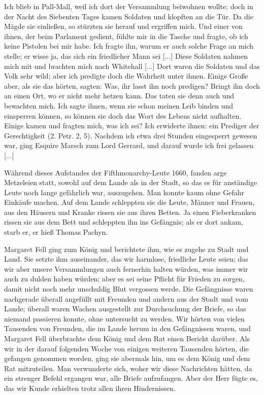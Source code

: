 Ich blieb in Pall-Mall, weil ich dort der Versammlung beiwohnen 
wollte; doch in der Nacht des Siebenten Tages kamen
Soldaten und klopften an die Tür. Da die Mägde sie einließen,
so stürzten sie herauf und ergriffen mich. Und einer von ihnen,
der beim Parlament gedient, fühlte mir in die Tasche und fragte,
ob ich keine Pistolen bei mir habe. Ich fragte ihn, warum er
auch solche Frage an mich stelle; er wisse ja, das sich ein 
friedlicher Mann sei [...] Diese Soldaten nahmen mich mit und
brachten mich nach Whitehall [...] Dort waren die Soldaten
und das Volk sehr wild; aber ich predigte doch die Wahrheit
unter ihnen. Einige Große aber, als sie das hörten, sagten:
\glqq Was, ihr lasst ihn noch predigen? Bringt ihn doch an einen
Ort, wo er nicht mehr hetzen kann.\grqq{} Das taten sie denn auch
und bewachten mich. Ich sagte ihnen, wenn sie schon meinen
Leib binden und einsperren können, so können sie doch das Wort
des Lebens nicht aufhalten. Einige kamen und fragten mich,
was ich sei? Ich erwiderte ihnen: \glqq ein Prediger der 
Gerechtigkeit\grqq{} (2. Petr. 2, 5). Nachdem ich etwa drei 
Stunden eingesperrt gewesen war, ging Esquire Marsch zum Lord 
Gerrard, und darauf wurde ich frei gelassen [...]

Während dieses Aufstandes der Fifthmonarchy-Leute 1660,
fanden arge Metzeleien statt, sowohl auf dem Lande als in der
Stadt, so das es für anständige Leute noch lange gefährlich war,
auszugehen. Man konnte kaum ohne Gefahr Einkäufe machen.
Auf dem Lande schleppten sie die Leute, Männer und Frauen,
aus den Häusern und Kranke rissen sie aus ihren Betten. Ja
einen Fieberkranken rissen sie aus dem Bett und schleppten ihn
ins Gefängnis; als er dort ankam, starb er, er hieß Thomas
Pachyn.

Margaret Fell ging zum König und berichtete ihm, wie es
zugehe zu Stadt und Land. Sie setzte ihm auseinander, das wir
harmlose, friedliche Leute seien; das wir aber unsere Versammlungen 
auch fernerhin halten würden, was immer wir auch zu
dulden haben würden; aber es sei seine Pflicht für Frieden zu
sorgen, damit nicht noch mehr unschuldig Blut vergossen werde.
Die Gefängnisse waren nachgerade überall angefüllt mit
Freunden und andern aus der Stadt und vom Lande; überall
waren Wachen ausgestellt zur Durchsuchung der Briefe, so das
niemand passieren konnte, ohne untersucht zu werden. Wir hörten
von vielen Tausenden von Freunden, die im Lande herum in den
Gefängnissen waren, und Margaret Fell überbrachte dem König
und dem Rat einen Bericht darüber. Als wir in der darauf 
folgenden Woche von einigen weiteren Tausenden hörten, die 
gefangen genommen worden, ging sie abermals hin, um es dem König
und dem Rat mitzuteilen. Man verwunderte sich, woher wir
diese Nachrichten hätten, da ein strenger Befehl ergangen war,
alle Briefe aufzufangen. Aber der Herr fügte es, das wir Kunde
erhielten trotz allen ihren Hindernissen.

